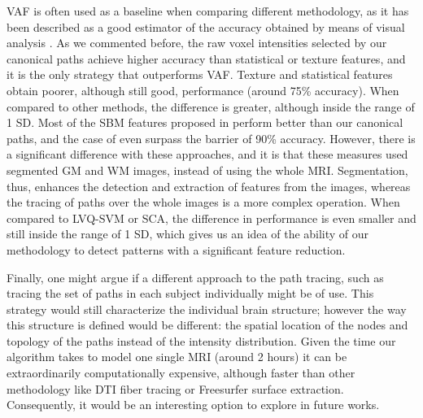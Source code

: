 	
	\ac{VAF} is often used as a baseline when comparing different methodology, as it has been described as a good estimator of the accuracy obtained by means of visual analysis \cite{Stoeckel04}. As we commented before, the raw voxel intensities selected by our canonical paths achieve higher accuracy than statistical or texture features, and it is the only strategy that outperforms \ac{VAF}. Texture and statistical features obtain poorer, although still good, performance (around 75\% accuracy). When compared to other methods, the difference is greater, although inside the range of 1 SD. Most of the \ac{SBM} features proposed in \cite{Martinez-Murcia2015} perform better than our canonical paths, and the case of \cite{Martinez-MurciaVRLBP} even surpass the barrier of 90\% accuracy. However, there is a significant difference with these approaches, and it is that these measures used segmented \ac{GM} and \ac{WM} images, instead of using the whole MRI. Segmentation, thus, enhances the detection and extraction of features from the images, whereas the tracing of paths over the whole images is a more complex operation. When compared to LVQ-SVM or SCA, the difference in performance is even smaller and still inside the range of 1 SD, which gives us an idea of the ability of our methodology to detect patterns with a significant feature reduction.
	
	Finally, one might argue if a different approach to the path tracing, such as tracing the set of paths in each subject individually might be of use. This strategy would still characterize the individual brain structure; however the way this structure is defined would be different: the spatial location of the nodes and topology of the paths instead of the intensity distribution. Given the time our algorithm takes to model one single MRI (around 2 hours) it can be extraordinarily computationally expensive, although faster than other methodology like DTI fiber tracing or Freesurfer surface extraction. Consequently, it would be an interesting option to explore in future works. 